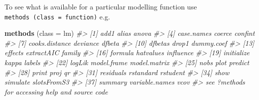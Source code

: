 \documentclass[
]{book}
\newenvironment{Shaded}{\begin{snugshade}}{\end{snugshade}}
\newcommand{\AttributeTok}[1]{\textcolor[rgb]{0.13,0.29,0.53}{#1}}
\newcommand{\CommentTok}[1]{\textcolor[rgb]{0.56,0.35,0.01}{\textit{#1}}}
\newcommand{\FunctionTok}[1]{\textcolor[rgb]{0.13,0.29,0.53}{\textbf{#1}}}
\newcommand{\NormalTok}[1]{#1}
\begin{document}
To see what is available for a particular modelling function use \texttt{methods\ (class\ =\ function)} e.g.

\begin{Shaded}
\begin{Highlighting}[]
\FunctionTok{methods}\NormalTok{ (}\AttributeTok{class =}\NormalTok{ lm)}
\CommentTok{\#\textgreater{}  [1] add1           alias          anova         }
\CommentTok{\#\textgreater{}  [4] case.names     coerce         confint       }
\CommentTok{\#\textgreater{}  [7] cooks.distance deviance       dfbeta        }
\CommentTok{\#\textgreater{} [10] dfbetas        drop1          dummy.coef    }
\CommentTok{\#\textgreater{} [13] effects        extractAIC     family        }
\CommentTok{\#\textgreater{} [16] formula        hatvalues      influence     }
\CommentTok{\#\textgreater{} [19] initialize     kappa          labels        }
\CommentTok{\#\textgreater{} [22] logLik         model.frame    model.matrix  }
\CommentTok{\#\textgreater{} [25] nobs           plot           predict       }
\CommentTok{\#\textgreater{} [28] print          proj           qr            }
\CommentTok{\#\textgreater{} [31] residuals      rstandard      rstudent      }
\CommentTok{\#\textgreater{} [34] show           simulate       slotsFromS3   }
\CommentTok{\#\textgreater{} [37] summary        variable.names vcov          }
\CommentTok{\#\textgreater{} see \textquotesingle{}?methods\textquotesingle{} for accessing help and source code}
\end{Highlighting}
\end{Shaded}
\end{document}
